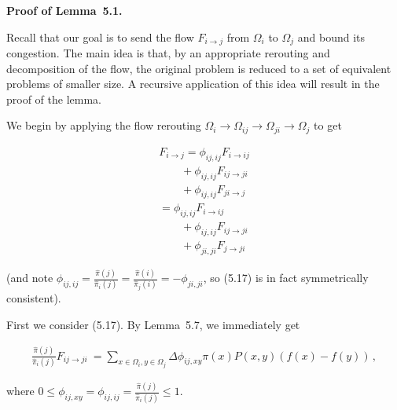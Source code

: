 \par\medskip\noindent\textbf{Proof of Lemma 5.1.}\par



Recall that our goal is to send the flow $F_{i\rightarrow j}$ from $\Omega_{i}$ to $\Omega_{j}$ and bound its congestion. The main idea is that, by an appropriate rerouting and decomposition of the flow, the original problem is reduced to a set of equivalent problems of smaller size. A recursive application of this idea will result in the proof of the lemma.\par




We begin by applying the flow rerouting $\Omega_{i}\rightarrow\Omega_{ij}\rightarrow\Omega_{ji}\rightarrow\Omega_{j}$ to get\par


\[\begin{gathered}
\displaystyle F_{i\rightarrow j} \displaystyle=\phi_{ij,ij}F_{i\rightarrow ij} \\
\displaystyle\qquad+\phi_{ij,ij}F_{ij\rightarrow ji} \\
\displaystyle\qquad+\phi_{ij,ij}F_{ji\rightarrow j} \\
\displaystyle=\phi_{ij,ij}F_{i\rightarrow ij} \\
\displaystyle\qquad+\phi_{ij,ij}F_{ij\rightarrow ji} \\
\displaystyle\qquad+\phi_{ji,ji}F_{j\rightarrow ji}
\end{gathered}\]




(and note $\phi_{ij,ij}=\frac{\hat{\pi}(j)}{\hat{\pi}_{i}(j)}=\frac{\hat{\pi}(i)}{\hat{\pi}_{j}(i)}=-\phi_{ji,ji}$, so (5.17) is in fact symmetrically consistent).\par




First we consider (5.17). By Lemma 5.7, we immediately get\par


\[\begin{gathered}
\frac{\hat{\pi}(j)}{\hat{\pi}_{i}(j)}F_{ij\rightarrow ji}\ =\sum_{x\in\Omega_{i},y\in\Omega_{j}}\Delta\phi_{ij,xy}\pi(x)P(x,y)\left(f(x)-f(y)\right)\,,
\end{gathered}\]


where $0\leq\phi_{ij,xy}=\phi_{ij,ij}=\frac{\hat{\pi}(j)}{\hat{\pi}_{i}(j)}\leq 1.$\par




